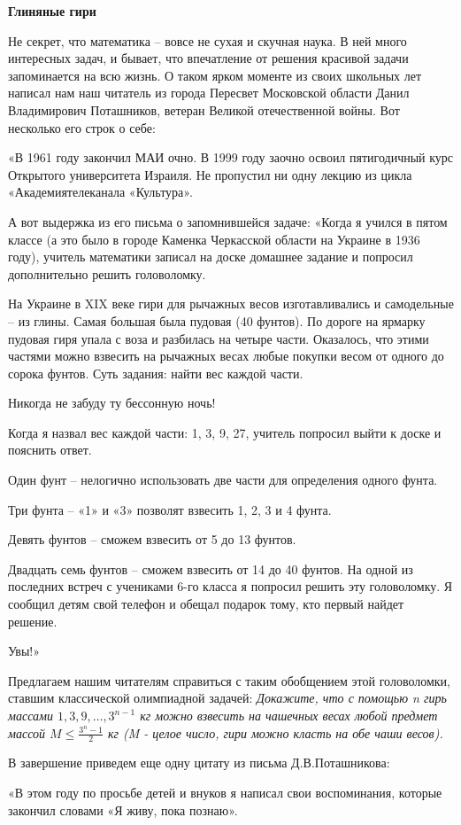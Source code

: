 \begin{multicols}{2}
{
\centering
\Large
  \centering \textbf{Глиняные гири}
\normalsize
\par
}

Не секрет, что математика – вовсе не сухая и скучная наука. В ней много интересных задач, и бывает, что впечатление от решения красивой задачи запоминается на всю жизнь.
О таком ярком моменте из своих школьных лет написал нам наш читатель из города Пересвет Московской области Данил Владимирович Поташников, ветеран Великой отечественной войны. Вот несколько его строк о себе:

«В 1961 году закончил МАИ очно. В 1999 году заочно освоил пятигодичный курс Открытого университета Израиля. Не пропустил ни одну лекцию из цикла «Академиятелеканала «Культура».

А вот выдержка из его письма о запомнившейся задаче:
«Когда я учился в пятом классе (а это было в городе Каменка Черкасской области на Украине в 1936 году), учитель математики записал на доске домашнее задание и попросил дополнительно решить головоломку.

На Украине в XIX веке гири для рычажных весов изготавливались и самодельные – из глины. Самая большая была пудовая (40 фунтов). По дороге на ярмарку пудовая гиря упала с воза и разбилась на четыре части. Оказалось, что этими частями можно взвесить на рычажных весах любые покупки весом от одного до сорока фунтов. Суть задания: найти вес каждой части.

Никогда не забуду ту бессонную ночь!

\columnbreak
Когда я назвал вес каждой части: 1, 3, 9, 27, учитель попросил выйти к доске и пояснить ответ.

Один фунт – нелогично использовать две части для определения одного фунта.

Три фунта – «1» и «3» позволят взвесить 1, 2, 3 и 4 фунта.

Девять фунтов – сможем взвесить от 5 до 13 фунтов.

Двадцать семь фунтов – сможем взвесить от 14 до 40 фунтов.
На одной из последних встреч с учениками 6-го класса я попросил решить эту головоломку. Я сообщил детям свой телефон и обещал подарок тому, кто первый найдет решение.

Увы!»

Предлагаем нашим читателям справиться с таким обобщением этой головоломки, ставшим классической олимпиадной задачей: \textit{Докажите, что с помощью n гирь массами $1, 3, 9, \dots, 3^{n - 1}$ кг можно взвесить на чашечных весах любой предмет массой $M \leq \frac{3^n - 1}{2}$ кг (M - целое число, гири можно класть на обе чаши весов).}

В завершение приведем еще одну цитату из письма
Д.В.Поташникова:

«В этом году по просьбе детей и внуков я написал свои воспоминания, которые закончил словами «Я живу, пока познаю».
\end{multicols}
